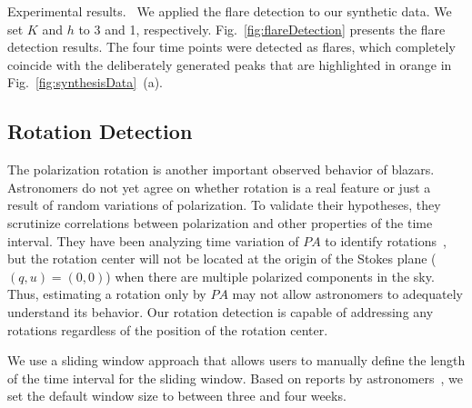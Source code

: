 \textsf{Experimental results.\ } We applied the flare detection to our synthetic data.
We set $K$ and $h$ to 3 and 1, respectively.
Fig.~\ref{fig:flareDetection} presents the flare detection results.
The four time points were detected as flares,
which completely coincide with the deliberately generated peaks that are highlighted in orange in Fig.~\ref{fig:synthesisData}~(a).

\subsection{Rotation Detection}\label{sec:rotationDetection}
The polarization rotation is another important observed behavior of blazars. 
Astronomers do not yet agree on whether rotation is a real feature or just a result of random variations of polarization.
To validate their hypotheses, they scrutinize correlations between polarization and other properties of the time interval.
They have been analyzing time variation of $PA$ to identify rotations~\cite{Ikejiri2011, Uemura2017},
but the rotation center will not be located at the origin of the Stokes plane ($(q, u) = (0, 0)$) when there are multiple polarized components in the sky.
Thus, estimating a rotation only by $PA$ may not allow astronomers to adequately understand its behavior.
Our rotation detection is capable of addressing any rotations regardless of the position of the rotation center.

We use a sliding window approach that allows users to manually define the length of the time interval for the sliding window. Based on reports by astronomers~\cite{Sasada2012}, we set the default window size to between three and four weeks.

